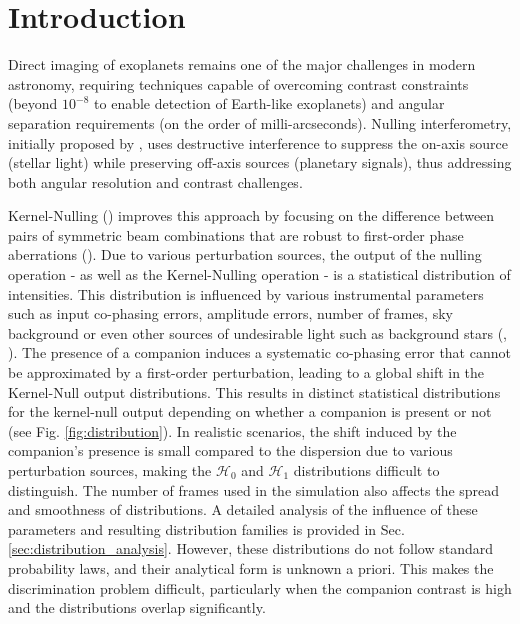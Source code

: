 \documentclass{article}
\begin{document}
\section{Introduction}

Direct imaging of exoplanets remains one of the major challenges in modern astronomy, requiring techniques capable of overcoming contrast constraints (beyond $10^{-8}$ to enable detection of Earth-like exoplanets) and angular separation requirements (on the order of milli-arcseconds). Nulling interferometry, initially proposed by \cite{Bracewell1979}, uses destructive interference to suppress the on-axis source (stellar light) while preserving off-axis sources (planetary signals), thus addressing both angular resolution and contrast challenges.

Kernel-Nulling (\cite{Martinache2018}) improves this approach by focusing on the difference between pairs of symmetric beam combinations that are robust to first-order phase aberrations (\cite{Martinache2018}). Due to various perturbation sources, the output of the nulling operation - as well as the Kernel-Nulling operation - is a statistical distribution of intensities. This distribution is influenced by various instrumental parameters such as input co-phasing errors, amplitude errors, number of frames, sky background or even other sources of undesirable light such as background stars (\cite{Hanot2011}, \cite{Cvetojevic2022}). The presence of a companion induces a systematic co-phasing error that cannot be approximated by a first-order perturbation, leading to a global shift in the Kernel-Null output distributions. This results in distinct statistical distributions for the kernel-null output depending on whether a companion is present or not (see Fig. \ref{fig:distribution}). In realistic scenarios, the shift induced by the companion's presence is small compared to the dispersion due to various perturbation sources, making the $\mathcal{H}_0$ and $\mathcal{H}_1$ distributions difficult to distinguish. The number of frames used in the simulation also affects the spread and smoothness of distributions. A detailed analysis of the influence of these parameters and resulting distribution families is provided in Sec. \ref{sec:distribution_analysis}. However, these distributions do not follow standard probability laws, and their analytical form is unknown a priori. This makes the discrimination problem difficult, particularly when the companion contrast is high and the distributions overlap significantly.
\end{document}
